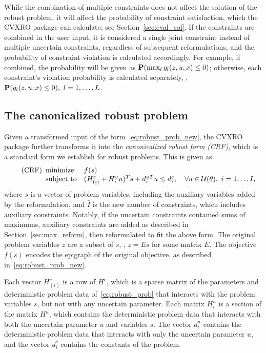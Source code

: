 While the combination of multiple constraints does not affect the solution of the robust problem, it will affect the probability of constraint satisfaction, which the \gls{CVXRO} package can calculate; see Section~\ref{sec:eval_sol}. If the constraints are combined in the user input, it is considered a single joint constraint instead of multiple uncertain constraints, regardless of subsequent reformulations, and the probability of constraint violation is calculated accordingly. For example, if combined, the probability will be given as ${\mathbf P}(\max_{l}g_l(z,u,x)\leq 0)$; otherwise, each constraint's violation probability is calculated separately, \ie, ${\mathbf P}(g_{l}(z,u,x)\leq 0),~l = 1,\dots,L$.

\subsection{The canonicalized robust problem}
\label{sec:canon_procedure}
Given a transformed input of the form~\eqref{eq:robust_prob_new}, the \gls{CVXRO} package further transforms it into the {\it canonicalized robust form (CRF)}, which is a standard form we establish for robust problems. This is given as
\begin{equation}
\tag{CRF}
	\label{eq:canon_robust}
	\begin{array}[t]{ll}
		\mbox{minimize}  & f(s)\\
		\mbox{subject to} & (H_{(i)}^c + H^u_iu)^Ts + d^{uT}_iu \le d^c_i,  \quad \forall u \in {\mathcal{U}}(\theta),~i = 1,\dots \bar{I},\\
	\end{array}
\end{equation}
where $s$ is a vector of problem variables, including the auxiliary variables added by the reformulation, and $\bar{I}$ is the new number of constraints, which includes auxiliary constraints. Notably, if the uncertain constraints contained sums of maximums, auxiliary constraints are added as described in Section~\ref{sec:max_reform}, then reformulated to fit the above form. The original problem variables $z$ are a subset of $s$, \ie, $z = Es$ for some matrix $E$. 
The objective $f(s)$ encodes the epigraph of the original objective, as described in~\eqref{eq:robust_prob_new}.


Each vector $H_{(i)}^c$ is a row of $H^c$, which is a sparse matrix of the parameters and deterministic problem data of~\eqref{eq:robust_prob} that interacts with the problem variables $s$, but not with any uncertain parameter. 
Each matrix $H^u_i$ is a section of the matrix $H^u$, which contains the deterministic problem data that interacts with both the uncertain parameter $u$ and variables $s$.
The vector $d^u_i$ contains the deterministic problem data that interacts with only the uncertain parameter $u$, and the vector $d^c_i$ contains the constants of the problem.

